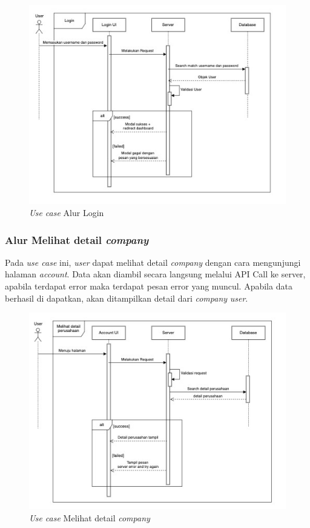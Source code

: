 \begin{figure}[ht]
  \centering
  \includegraphics[width=1\textwidth]{resources/chapter-3/usecase/uc-05.jpg}
  \caption{\textit{Use case} Alur Login}
  \label{fig:usecase-05}
\end{figure}

\subsubsection{Alur Melihat detail \textit{company}}

Pada \textit{use case} ini, \textit{user} dapat melihat detail \textit{company} dengan cara mengunjungi halaman \textit{account}. Data akan diambil secara langsung melalui API Call ke server, apabila terdapat error maka terdapat pesan error yang muncul. Apabila data berhasil di dapatkan, akan ditampilkan detail dari \textit{company} \textit{user}.

\begin{figure}[ht]
  \centering
  \includegraphics[width=1\textwidth]{resources/chapter-3/usecase/uc-06.jpg}
  \caption{\textit{Use case} Melihat detail \textit{company}}
  \label{fig:usecase-06}
\end{figure}


